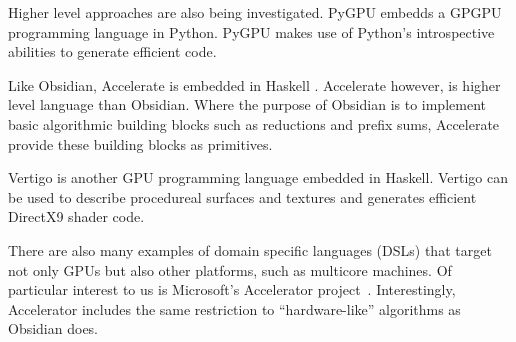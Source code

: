 Higher level approaches are also being investigated. PyGPU embedds a GPGPU 
programming language in Python. PyGPU makes use of Python's 
introspective abilities to generate efficient code. 

Like Obsidian, Accelerate is embedded in Haskell . Accelerate 
however, is higher level language than Obsidian. Where the purpose of 
Obsidian is to implement basic algorithmic building blocks such as 
reductions and prefix sums, Accelerate provide these building blocks as 
primitives. 

Vertigo is another GPU programming language embedded in Haskell.
Vertigo can be used to describe procedureal surfaces and textures and generates
efficient DirectX9 shader code. 

There are also many examples of domain specific languages (DSLs)
that target not only GPUs but also other platforms, such as multicore machines.
Of particular interest to us is Microsoft's Accelerator project~. Interestingly, Accelerator includes the same restriction to ``hardware-like'' algorithms as Obsidian does.



 




